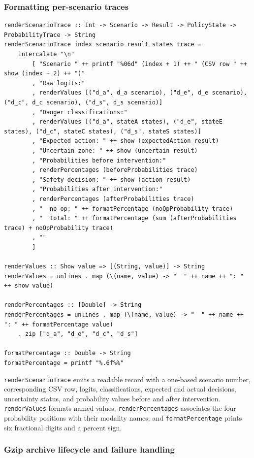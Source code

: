 \documentclass[11pt]{article}
\begin{document}
\subsubsection{Formatting per-scenario traces}

\begin{lstlisting}
renderScenarioTrace :: Int -> Scenario -> Result -> PolicyState -> ProbabilityTrace -> String
renderScenarioTrace index scenario result states trace =
    intercalate "\n"
        [ "Scenario " ++ printf "%06d" (index + 1) ++ " (CSV row " ++ show (index + 2) ++ ")"
        , "Raw logits:"
        , renderValues [("d_a", d_a scenario), ("d_e", d_e scenario), ("d_c", d_c scenario), ("d_s", d_s scenario)]
        , "Danger classifications:"
        , renderValues [("d_a", stateA states), ("d_e", stateE states), ("d_c", stateC states), ("d_s", stateS states)]
        , "Expected action: " ++ show (expectedAction result)
        , "Uncertain zone: " ++ show (uncertain result)
        , "Probabilities before intervention:"
        , renderPercentages (beforeProbabilities trace)
        , "Safety decision: " ++ show (action result)
        , "Probabilities after intervention:"
        , renderPercentages (afterProbabilities trace)
        , "  no_op: " ++ formatPercentage (noOpProbability trace)
        , "  total: " ++ formatPercentage (sum (afterProbabilities trace) + noOpProbability trace)
        , ""
        ]

renderValues :: Show value => [(String, value)] -> String
renderValues = unlines . map (\(name, value) -> "  " ++ name ++ ": " ++ show value)

renderPercentages :: [Double] -> String
renderPercentages = unlines . map (\(name, value) -> "  " ++ name ++ ": " ++ formatPercentage value)
    . zip ["d_a", "d_e", "d_c", "d_s"]

formatPercentage :: Double -> String
formatPercentage = printf "%.6f%%"
\end{lstlisting}

\texttt{renderScenarioTrace} emits a readable record with a one-based scenario
number, corresponding CSV row, logits, classifications, expected and actual
decisions, uncertainty status, and probability values before and after
intervention. \texttt{renderValues} formats named values;
\texttt{renderPercentages} associates the four probability positions with
their modality names; and \texttt{formatPercentage} prints six fractional
digits and a percent sign.

\subsubsection{Gzip archive lifecycle and failure handling}
\end{document}
